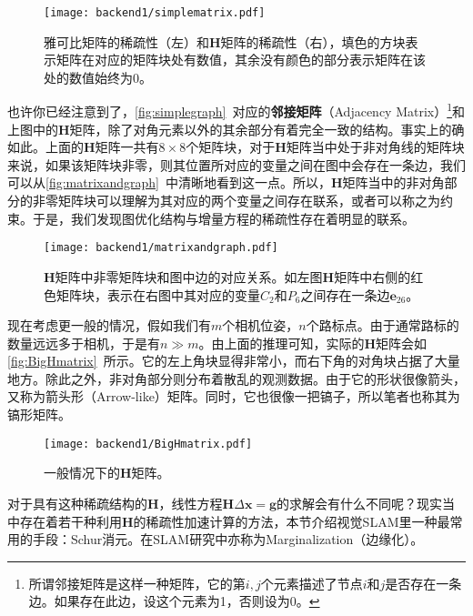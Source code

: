 \begin{figure}[!htp]
	\centering
	\texttt{[image: backend1/simplematrix.pdf]}
	\caption{雅可比矩阵的稀疏性（左）和$\bm{H}$矩阵的稀疏性（右），填色的方块表示矩阵在对应的矩阵块处有数值，其余没有颜色的部分表示矩阵在该处的数值始终为0。}
	\label{fig:simplematrix}
\end{figure}

\newpage
也许你已经注意到了，\autoref{fig:simplegraph}~对应的\textbf{邻接矩阵}（Adjacency Matrix）\footnote{所谓邻接矩阵是这样一种矩阵，它的第$i,j$个元素描述了节点$i$和$j$是否存在一条边。如果存在此边，设这个元素为1，否则设为0。}和上图中的$\bm{H}$矩阵，除了对角元素以外的其余部分有着完全一致的结构。事实上的确如此。上面的$\bm{H}$矩阵一共有$8 \times 8$个矩阵块，对于$\bm{H}$矩阵当中处于非对角线的矩阵块来说，如果该矩阵块非零，则其位置所对应的变量之间在图中会存在一条边，我们可以从\autoref{fig:matrixandgraph}~中清晰地看到这一点。所以，$\bm{H}$矩阵当中的非对角部分的非零矩阵块可以理解为其对应的两个变量之间存在联系，或者可以称之为约束。于是，我们发现图优化结构与增量方程的稀疏性存在着明显的联系。

\begin{figure}[!htp]
	\centering
	\texttt{[image: backend1/matrixandgraph.pdf]}
	\caption{$\bm{H}$矩阵中非零矩阵块和图中边的对应关系。如左图$\bm{H}$矩阵中右侧的红色矩阵块，表示在右图中其对应的变量$C_2$和$P_6$之间存在一条边$\bm{e}_{26}$。}
	\label{fig:matrixandgraph}
\end{figure}

现在考虑更一般的情况，假如我们有$m$个相机位姿，$n$个路标点。由于通常路标的数量远远多于相机，于是有$n \gg m$。由上面的推理可知，实际的$\bm{H}$矩阵会如\autoref{fig:BigHmatrix}~所示。它的左上角块显得非常小，而右下角的对角块占据了大量地方。除此之外，非对角部分则分布着散乱的观测数据。由于它的形状很像箭头，又称为箭头形（Arrow-like）矩阵\textsuperscript{\cite{Barfoot2016}}。同时，它也很像一把镐子，所以笔者也称其为镐形矩阵。

\begin{figure}[!ht]
	\centering
	\texttt{[image: backend1/BigHmatrix.pdf]}
	\caption{一般情况下的$\bm{H}$矩阵。}
	\label{fig:BigHmatrix}
\end{figure}

对于具有这种稀疏结构的$\bm{H}$，线性方程$\bm{H} \Delta \bm{x}= \bm{g}$的求解会有什么不同呢？现实当中存在着若干种利用$\bm{H}$的稀疏性加速计算的方法，本节介绍视觉SLAM里一种最常用的手段：Schur消元。在SLAM研究中亦称为Marginalization（边缘化）。


